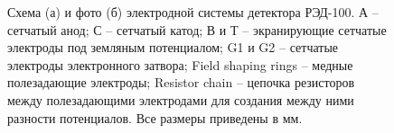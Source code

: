 \begin{figure}[ht]
  \begin{minipage}[ht]{0.34\linewidth}  
  \end{minipage}
  \caption[Схема и фото электродной системы детектора РЭД-100] {Схема (а) и фото (б) электродной системы детектора РЭД-100. А – сетчатый анод; С – сетчатый катод; В и Т – экранирующие сетчатые электроды под земляным потенциалом; G1 и G2 – сетчатые электроды электронного затвора; Field shaping rings – медные полезадающие электроды;  Resistor chain – цепочка резисторов между полезадающими электродами для создания между ними разности потенциалов. Все размеры приведены в мм.}
  \label{img:red100electrodes}  
\end{figure}

